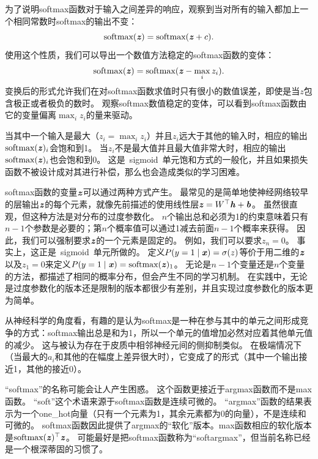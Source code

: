 
为了说明softmax函数对于输入之间差异的响应，观察到当对所有的输入都加上一个相同常数时softmax的输出不变：
\begin{equation}
\text{softmax}(\boldsymbol{\mathit{z}}) = \text{softmax}(\boldsymbol{\mathit{z}}+c).
\end{equation}
使用这个性质，我们可以导出一个数值方法稳定的softmax函数的变体：
\begin{equation}
\text{softmax}(\boldsymbol{\mathit{z}}) = \text{softmax}(\boldsymbol{\mathit{z}}- \max_i z_i).
\end{equation}
变换后的形式允许我们在对softmax函数求值时只有很小的数值误差，即使是当$z$包含极正或者极负的数时。
观察softmax数值稳定的变体，可以看到softmax函数由它的变量偏离$\max_i z_i$的量来驱动。

当其中一个输入是最大（$z_i = \max_i z_i$）并且$z_i$远大于其他的输入时，相应的输出$\text{softmax}(\boldsymbol{\mathit{z}})_i$会饱和到1。
当$z_i$不是最大值并且最大值非常大时，相应的输出$\text{softmax}(\boldsymbol{\mathit{z}})_i$也会饱和到0。
这是~\gls{sigmoid}~单元饱和方式的一般化，并且如果损失函数不被设计成对其进行补偿，那么也会造成类似的学习困难。

softmax函数的变量$\boldsymbol{\mathit{z}}$可以通过两种方式产生。
最常见的是简单地使神经网络较早的层输出$\boldsymbol{\mathit{z}}$的每个元素，就像先前描述的使用线性层$\boldsymbol{\mathit{z}}={W}^\top\boldsymbol{\mathit{h}}+\boldsymbol{\mathit{b}}$。
虽然很直观，但这种方法是对分布的过度参数化。
$n$个输出总和必须为1的约束意味着只有$n-1$个参数是必要的；第$n$个概率值可以通过1减去前面$n-1$个概率来获得。
因此，我们可以强制要求$\boldsymbol{\mathit{z}}$的一个元素是固定的。
例如，我们可以要求$z_n=0$。
事实上，这正是~\gls{sigmoid}~单元所做的。
定义$P(y=1\mid\boldsymbol{\mathit{x}})=\sigma(z)$等价于用二维的$\boldsymbol{\mathit{z}}$以及$z_1=0$来定义$P(y=1\mid\boldsymbol{\mathit{x}})=\text{softmax}(\boldsymbol{\mathit{z}})_1$。
无论是$n-1$个变量还是$n$个变量的方法，都描述了相同的概率分布，但会产生不同的学习机制。
在实践中，无论是过度参数化的版本还是限制的版本都很少有差别，并且实现过度参数化的版本更为简单。

从神经科学的角度看，有趣的是认为softmax是一种在参与其中的单元之间形成竞争的方式：softmax输出总是和为1，所以一个单元的值增加必然对应着其他单元值的减少。
这与被认为存在于皮质中相邻神经元间的侧抑制类似。
在极端情况下（当最大的$a_i$和其他的在幅度上差异很大时），它变成了的形式（其中一个输出接近1，其他的接近0）。

``softmax''的名称可能会让人产生困惑。
这个函数更接近于argmax函数而不是max函数。
``soft''这个术语来源于softmax函数是连续可微的。
``argmax''函数的结果表示为一个\gls{one_hot}向量（只有一个元素为1，其余元素都为0的向量），不是连续和可微的。
softmax函数因此提供了argmax的``软化''版本。max函数相应的软化版本是$\text{softmax}(\boldsymbol{\mathit{z}})^\top \boldsymbol{\mathit{z}}$。
可能最好是把softmax函数称为``softargmax''，但当前名称已经是一个根深蒂固的习惯了。


